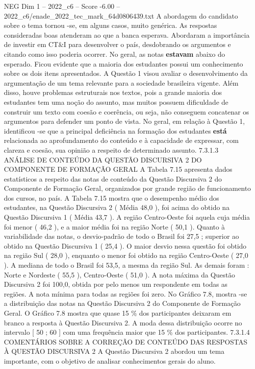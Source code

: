 \begin{textsample}{NEG Dim 1 – 2022\_c6 – Score -6.00 – 2022\_c6/enade\_2022\_tec\_mark\_64d0806439.txt}
A abordagem do candidato sobre o tema tornou -se, em alguns casos, muito genérica.
As respostas consideradas boas atenderam ao que a banca esperava.
Abordaram a importância de investir em CT\&I para desenvolver o país, desdobrando os argumentos e citando como isso poderia ocorrer.
No geral, as notas \textbf{estavam} abaixo do esperado.
Ficou evidente que a maioria dos estudantes possui um conhecimento sobre os dois itens apresentados.
A Questão 1 visou avaliar o desenvolvimento da argumentação de um tema relevante para a sociedade brasileira vigente.
Além disso, houve problemas estruturais nos textos, pois a grande maioria dos estudantes tem uma noção do assunto, mas muitos possuem dificuldade de construir um texto com coesão e coerência, ou seja, não conseguem concatenar os argumentos para defender um ponto de vista.
No geral, em relação à Questão 1, identificou -se que a principal deficiência na formação dos estudantes \textbf{está} relacionada ao aprofundamento do conteúdo e à capacidade de expressar, com clareza e coesão, sua opinião a respeito de determinado assunto. 7.3.1.3 ANÁLISE DE CONTEÚDO DA QUESTÃO DISCURSIVA 2 DO COMPONENTE DE FORMAÇÃO GERAL A Tabela 7.15 apresenta dados estatísticos a respeito das notas de conteúdo da Questão Discursiva 2 do Componente de Formação Geral, organizados por grande região de funcionamento dos cursos, no país.
A Tabela 7.15 mostra que o desempenho médio dos estudantes, na Questão Discursiva 2 ( Média 48,0 ), foi acima do obtido na Questão Discursiva 1 ( Média 43,7 ).
A região Centro-Oeste foi aquela cuja média foi menor ( 46,2 ), e a maior média foi na região Norte ( 50,1 ).
Quanto à variabilidade das notas, o desvio-padrão de todo o Brasil foi 27,5 ; superior ao obtido na Questão Discursiva 1 ( 25,4 ).
O maior desvio nessa questão foi obtido na região Sul ( 28,0 ), enquanto o menor foi obtido na região Centro-Oeste ( 27,0 ).
A mediana de todo o Brasil foi 53,5, a mesma da região Sul.
As demais foram : Norte e Nordeste ( 55,5 ), Centro-Oeste ( 51,0 ).
A nota máxima da Questão Discursiva 2 foi 100,0, obtida por pelo menos um respondente em todas as regiões.
A nota mínima para todas as regiões foi zero.
No Gráfico 7.8, mostra -se a distribuição das notas na Questão Discursiva 2 do Componente de Formação Geral.
O Gráfico 7.8 mostra que quase 15 \% dos participantes deixaram em branco a resposta à Questão Discursiva 2.
A moda dessa distribuição ocorre no intervalo [ 50 ; 60 ] com uma frequência maior que 15 \% dos participantes. 7.3.1.4 COMENTÁRIOS SOBRE A CORREÇÃO DE CONTEÚDO DAS RESPOSTAS À QUESTÃO DISCURSIVA 2 A Questão Discursiva 2 abordou um tema importante, com o objetivo de analisar conhecimentos gerais do aluno.

\end{textsample}
